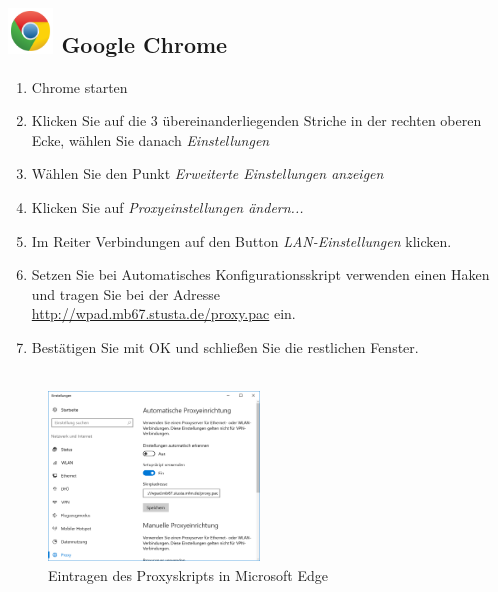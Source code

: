\documentclass[a4paper,12pt]{scrartcl}
\begin{document}
\subsection*{\includegraphics[height=1.2cm,keepaspectratio]{Bilder/Chrome_2011_logo} Google Chrome}
\begin{enumerate}
	\item Chrome starten
    \item Klicken Sie auf die 3 übereinanderliegenden Striche in der rechten oberen Ecke, wählen Sie danach \emph{Einstellungen}
    \item Wählen Sie den Punkt \emph{Erweiterte Einstellungen anzeigen}
	\item Klicken Sie auf \emph{Proxyeinstellungen ändern...}
	\item Im Reiter Verbindungen auf den Button \emph{LAN-Ein\-stellungen} klicken.
    \item Setzen Sie bei Automatisches Konfigurationsskript verwenden einen Haken und tragen Sie bei der Adresse \\ \url{http://wpad.mb67.stusta.de/proxy.pac} ein.
    \item Bestätigen Sie mit OK und schließen Sie die restlichen Fenster.
    \\
    \\
\end{enumerate}


\begin{figure}
  \begin{center}
    \includegraphics[width=0.5\textwidth,keepaspectratio]{Bilder/Proxy_Edge_mb}
  \end{center}
  \caption{Eintragen des Proxyskripts in Microsoft Edge}
\end{figure}
\end{document}
